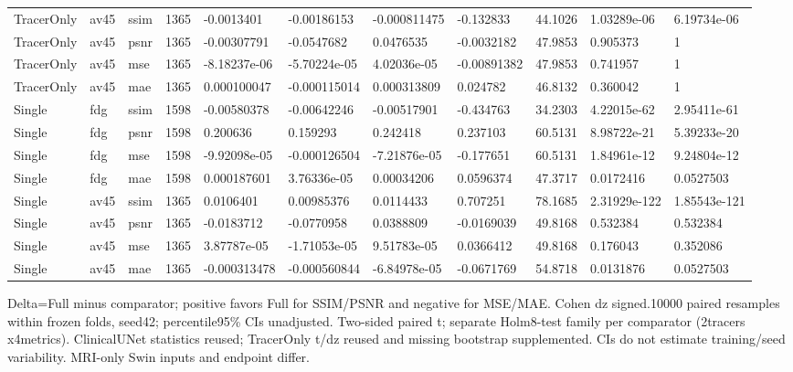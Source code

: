\documentclass{article}
\providecommand{\DIFaddtex}[1]{{\protect\color{blue} \sf #1}} %
\providecommand{\DIFadd}[1]{\texorpdfstring{\DIFaddtex{#1}}{#1}} %
\begin{document}
\begin{landscape}
\begin{longtable}{lllllllllll}
TracerOnly & av45 & ssim & 1365 & -0.0013401 & -0.00186153 & -0.000811475 & -0.132833 & 44.1026 & 1.03289e-06 & 6.19734e-06 \\
TracerOnly & av45 & psnr & 1365 & -0.00307791 & -0.0547682 & 0.0476535 & -0.0032182 & 47.9853 & 0.905373 & 1 \\
TracerOnly & av45 & mse & 1365 & -8.18237e-06 & -5.70224e-05 & 4.02036e-05 & -0.00891382 & 47.9853 & 0.741957 & 1 \\
TracerOnly & av45 & mae & 1365 & 0.000100047 & -0.000115014 & 0.000313809 & 0.024782 & 46.8132 & 0.360042 & 1 \\
Single & fdg & ssim & 1598 & -0.00580378 & -0.00642246 & -0.00517901 & -0.434763 & 34.2303 & 4.22015e-62 & 2.95411e-61 \\
Single & fdg & psnr & 1598 & 0.200636 & 0.159293 & 0.242418 & 0.237103 & 60.5131 & 8.98722e-21 & 5.39233e-20 \\
Single & fdg & mse & 1598 & -9.92098e-05 & -0.000126504 & -7.21876e-05 & -0.177651 & 60.5131 & 1.84961e-12 & 9.24804e-12 \\
Single & fdg & mae & 1598 & 0.000187601 & 3.76336e-05 & 0.00034206 & 0.0596374 & 47.3717 & 0.0172416 & 0.0527503 \\
Single & av45 & ssim & 1365 & 0.0106401 & 0.00985376 & 0.0114433 & 0.707251 & 78.1685 & 2.31929e-122 & 1.85543e-121 \\
Single & av45 & psnr & 1365 & -0.0183712 & -0.0770958 & 0.0388809 & -0.0169039 & 49.8168 & 0.532384 & 0.532384 \\
Single & av45 & mse & 1365 & 3.87787e-05 & -1.71053e-05 & 9.51783e-05 & 0.0366412 & 49.8168 & 0.176043 & 0.352086 \\
Single & av45 & mae & 1365 & -0.000313478 & -0.000560844 & -6.84978e-05 & -0.0671769 & 54.8718 & 0.0131876 & 0.0527503 \\
\end{longtable}
\noindent\parbox{\linewidth}{\footnotesize \DIFadd{Delta=Full minus comparator; positive favors Full for SSIM/PSNR and negative for MSE/MAE. Cohen dz signed.10000 paired resamples within frozen folds, seed42; percentile95\% CIs unadjusted. Two-sided paired t; separate Holm8-test family per comparator (2tracers x4metrics). ClinicalUNet statistics reused; TracerOnly t/dz reused and missing bootstrap supplemented. CIs do not estimate training/seed variability. MRI-only Swin inputs and endpoint differ.}}
\endgroup
\end{landscape}

\end{document}
